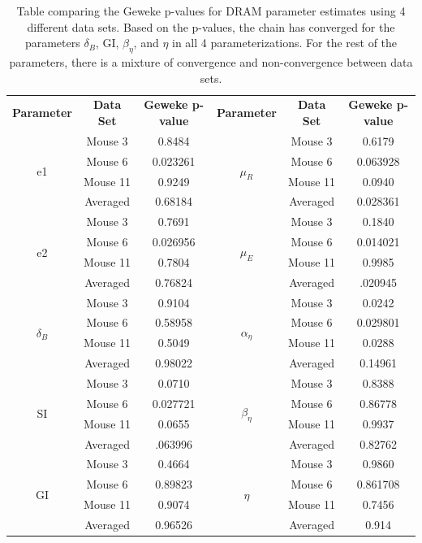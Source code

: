 \begin{table}[H]
\centering
        \begin{tabular}{c|c c|c| c c}
            \hline
            \textbf{Parameter} & \textbf{Data Set} &  \textbf{Geweke p-value} & \textbf{Parameter} & \textbf{Data Set} &  \textbf{Geweke p-value} \\
            \cline{1-6}
            \multirow{4}{*}{e1} & Mouse 3 & 0.8484 & \multirow{4}{*}{$\mu_R$} & Mouse 3 & 0.6179\\
            & Mouse 6 & 0.023261 & & Mouse 6 & 0.063928\\
            & Mouse 11 & 0.9249 & & Mouse 11 & 0.0940\\
            & Averaged & 0.68184 & & Averaged & 0.028361 \\\hline
            \multirow{4}{*}{e2}  & Mouse 3 & 0.7691 & \multirow{4}{*}{$\mu_E$} & Mouse 3 & 0.1840\\
            & Mouse 6 & 0.026956 & & Mouse 6 & 0.014021\\
            & Mouse 11 & 0.7804 & & Mouse 11 & 0.9985\\
            & Averaged & 0.76824 & & Averaged & .020945\\\hline
            \multirow{4}{*}{$\delta_B$} & Mouse 3 & 0.9104 & \multirow{4}{*}{$\alpha_\eta$} & Mouse 3 & 0.0242\\
            & Mouse 6 & 0.58958 & & Mouse 6 & 0.029801\\
            & Mouse 11 & 0.5049 & & Mouse 11 & 0.0288\\
            & Averaged & 0.98022 & & Averaged & 0.14961 \\\hline
            \multirow{4}{*}{SI} & Mouse 3 & 0.0710 & \multirow{4}{*}{$\beta_\eta$} & Mouse 3 & 0.8388 \\
            & Mouse 6 & 0.027721  & & Mouse 6 & 0.86778\\
            & Mouse 11 & 0.0655 &&  Mouse 11 & 0.9937\\
            & Averaged & .063996 & & Averaged & 0.82762\\\hline
            \multirow{4}{*}{GI} & Mouse 3 & 0.4664  & \multirow{4}{*}{$\eta$} & Mouse 3 & 0.9860\\
            & Mouse 6 & 0.89823 & & Mouse 6 & 0.861708\\
            & Mouse 11 & 0.9074  & &Mouse 11 & 0.7456\\
            & Averaged & 0.96526 & &Averaged & 0.914\\\hline
             \hline
        \end{tabular}
    \caption{Table comparing the Geweke p-values for DRAM parameter estimates using 4 different data sets. Based on the p-values, the chain has converged for the parameters $\delta_B$, GI, $\beta_\eta$, and $\eta$ in all 4 parameterizations. For the rest of the parameters, there is a mixture of convergence and non-convergence between data sets.}
    \label{tab:pvalComp}
\end{table}
